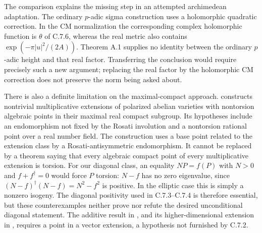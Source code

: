 The comparison explains the missing step in an attempted
archimedean adaptation. The ordinary $p$-adic sigma construction
uses a holomorphic quadratic correction. In the CM normalization
the corresponding complex holomorphic function is $\theta$
of C.7.6, whereas the real metric also contains
$\exp(-\pi|u|^2/(2A))$. Theorem A.1 supplies no identity
between the ordinary $p$-adic height and that real factor.
Transferring the conclusion would require precisely such a
new argument; replacing the real factor by the holomorphic
CM correction does not preserve the norm being asked about.

There is also a definite limitation on the maximal-compact
approach. \citet[Theorem 2.1]{bertrand1995} constructs
nontrivial multiplicative extensions of polarized abelian
varieties with nontorsion algebraic points in their maximal
real compact subgroup. Its hypotheses include an endomorphism
not fixed by the Rosati involution and a nontorsion rational
point over a real number field. The construction uses a base
point related to the extension class by a Rosati-antisymmetric
endomorphism. It cannot be replaced by a theorem saying that
every algebraic compact point of every multiplicative
extension is torsion. For our diagonal class, an equality
$NP=f(P)$ with $N>0$ and $f+f^\dagger=0$ would force
$P$ torsion: $N-f$ has no zero eigenvalue, since
$(N-f)^\dagger(N-f)=N^2-f^2$ is positive. In the elliptic
case this is simply a nonzero isogeny. The diagonal positivity
used in C.7.3--C.7.4 is therefore essential, but these
counterexamples neither prove nor refute the desired
unconditional diagonal statement. The additive result in
\citet[Theorem 3.1]{bertrand1995}, and its higher-dimensional
extension in \citet{bost2009}, requires a point in a vector
extension, a hypothesis not furnished by C.7.2.
